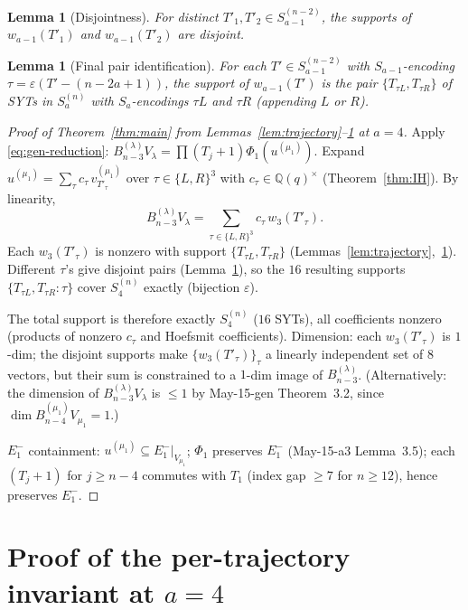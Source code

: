 \documentclass[11pt]{article}
\newtheorem{lemma}[theorem]{Lemma}
\theoremstyle{definition}
\begin{document}
\begin{lemma}[Disjointness]\label{lem:disjoint}
For distinct $T'_1,T'_2\in S_{a-1}^{(n-2)}$, the supports of
$w_{a-1}(T'_1)$ and $w_{a-1}(T'_2)$ are disjoint.
\end{lemma}

\begin{lemma}[Final pair identification]\label{lem:identification}
For each $T'\in S_{a-1}^{(n-2)}$ with $S_{a-1}$-encoding
$\tau=\varepsilon(T'-(n-2a+1))$, the support of $w_{a-1}(T')$ is
the pair $\{T_{\tau L},T_{\tau R}\}$ of SYTs in $S_a^{(n)}$ with
$S_a$-encodings $\tau L$ and $\tau R$ (appending $L$ or $R$).
\end{lemma}

\begin{proof}[Proof of Theorem~\ref{thm:main} from
Lemmas~\ref{lem:trajectory}--\ref{lem:identification} at $a=4$]
Apply \eqref{eq:gen-reduction}:
$B_{n-3}^{(\lambda)}V_\lambda=\prod(T_j{+}1)\Phi_1(u^{(\mu_1)})$.
Expand $u^{(\mu_1)}=\sum_\tau c_\tau\,v_{T'_\tau}^{(\mu_1)}$ over
$\tau\in\{L,R\}^3$ with $c_\tau\in\mathbb{Q}(q)^\times$
(Theorem~\ref{thm:IH}).  By linearity,
\[
   B_{n-3}^{(\lambda)}V_\lambda
   = \sum_{\tau\in\{L,R\}^3} c_\tau\,w_3(T'_\tau).
\]
Each $w_3(T'_\tau)$ is nonzero with support $\{T_{\tau L},T_{\tau R}\}$
(Lemmas~\ref{lem:trajectory},~\ref{lem:identification}).
Different $\tau$'s give disjoint pairs (Lemma~\ref{lem:disjoint}), so
the $16$ resulting supports $\{T_{\tau L},T_{\tau R}:\tau\}$ cover
$S_4^{(n)}$ exactly (bijection $\varepsilon$).

The total support is therefore exactly $S_4^{(n)}$ ($16$ SYTs), all
coefficients nonzero (products of nonzero $c_\tau$ and Hoefsmit
coefficients).  Dimension: each $w_3(T'_\tau)$ is $1$-dim; the disjoint
supports make $\{w_3(T'_\tau)\}_\tau$ a linearly independent set of
$8$ vectors, but their sum is constrained to a $1$-dim image of
$B_{n-3}^{(\lambda)}$.  (Alternatively: the dimension of
$B_{n-3}^{(\lambda)}V_\lambda$ is $\le 1$ by May-15-gen
Theorem~3.2, since $\dim B_{n-4}^{(\mu_1)}V_{\mu_1}=1$.)

$E_1^-$ containment: $u^{(\mu_1)}\subseteq E_1^-|_{V_{\mu_1}}$;
$\Phi_1$ preserves $E_1^-$ (May-15-a3 Lemma~3.5); each
$(T_j{+}1)$ for $j\ge n-4$ commutes with $T_1$ (index gap $\ge 7$ for
$n\ge 12$), hence preserves $E_1^-$.
\end{proof}

\section{Proof of the per-trajectory invariant at $a=4$}\label{sec:per-traj}
\end{document}

